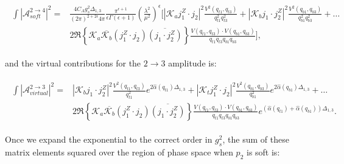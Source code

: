 		\begin{align}
		\begin{split}
			\int|\mathcal{A}^{2\rightarrow4}_{soft}|^2 = &\frac{4C_Ag_s^2\Delta_{1,3}}{(2\pi)^{2+2\epsilon}4\pi}
			\frac{\pi^{\epsilon+1}}{\epsilon\Gamma(\epsilon+1)}
			\left(\frac{\lambda^2}{\mu^2}\right)^\epsilon\Bigg[|\mathcal{K}_aj_1^Z\cdot j_2|^2
			\frac{V^2(q_{t1}, q_{t3})}{q^2_{t1}q^2_{t3}} + |\mathcal{K}_bj_1\cdot j_2^Z|^2
			\frac{V^2(q_{b1}, q_{b3})}{q^2_{b1}q^2_{b3}} + \ldots \\
			& 2\Re\left\{\mathcal{K}_a\overline{\mathcal{K}_b}
			(j_1^Z\cdot j_2)\overline{(j_1\cdot j_2^Z)}\right\} \frac{V(q_{t1}, q_{t3})
			\cdot V(q_{b1}, q_{b3})}{q_{t1}q_{t3}q_{b1}q_{b3}}\Bigg],
		\end{split}
		\end{align}

		and the virtual contributions for the $2\rightarrow3$ amplitude is:

		\begin{align}
		\begin{split}
			\int|\mathcal{A}^{2\rightarrow3}_{virtual}|^2 = &|\mathcal{K}_bj_1\cdot j_2^Z|^2
			\frac{V^2(q_{t1}, q_{t3})}{q_{t1}^2}e^{2\hat{\alpha}(q_{t1})\Delta_{1,3}} +
			|\mathcal{K}_tj_1^Z\cdot j_2|^2 \frac{V^2(q_{b1}, q_{b3})}{q_{b1}^2}e^{2\hat{\alpha}(q_{b1})\Delta_{1,3}} + \ldots \\
			& 2\Re\left\{\mathcal{K}_a\overline{\mathcal{K}_b}  (j_1^Z\cdot j_2)\overline{(j_1\cdot j_2^Z)}\right\}
			\frac{V(q_{t1}, q_{t3})\cdot V(q_{b1}, q_{b3})}{q_{t1}q_{t3}q_{b1}q_{b3}}e^{(\hat{\alpha}(q_{t1}) +
			\hat{\alpha}(q_{b1}))\Delta_{1,3}}.
		\end{split}
		\end{align}

		Once we expand the exponential to the correct order in $g_s^2$, the sum of these
		matrix elements squared over the region of phase space when $p_2$ is soft is:

